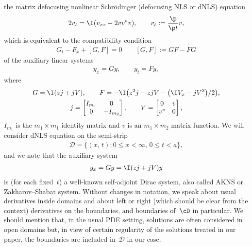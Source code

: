 the matrix defocusing nonlinear Schr\"odinger (defocusing NLS or dNLS) equation
\begin{gather} \label{1.1}
2v_t=\I(v_{xx}-2vv^*v), \qquad v_t:=\frac{\p}{\p t}v ,
\end{gather}
which is equivalent \cite{ZS1, ZS2} to the compatibility condition
\begin{gather} \label{zc}
G_t-F_x+[G,F]=0 \qquad [G,F]:=GF-FG
\end{gather}
of the auxiliary linear systems
\begin{gather} \label{au}
y_x=Gy, \qquad y_t=Fy,
\end{gather}
where
\begin{gather} \label{1.2}
G=\I (zj+jV), \qquad
F=-\I\big(z^2 j+ z jV-\big(\I V_x-jV^2\big)/2\big), \\
\label{1.3}
j = \left[
\begin{matrix}
I_{m_1} & 0 \\ 0 & -I_{m_2}
\end{matrix}
\right], \qquad V= \left[\begin{matrix}
0&v\\v^{*}&0\end{matrix}\right],
\end{gather}
$I_{m_1}$ is the $m_1\times m_1$ identity matrix and $v$ is an $m_1\times m_2$ matrix function.
We will consider dNLS equation on the semi-strip
\begin{gather}  \label{1.4}
{\mathcal D}=\{(x,\, t)\colon 0 \leq x <\infty, \, 0\leq t<a\},
\end{gather}
and we note that the auxiliary system
\begin{gather} \label{1.5}
y_x=Gy=\I(zj+jV)y
\end{gather}
is (for each f\/ixed~$t$) a well-known self-adjoint Dirac system, also called AKNS or Zakharov--Shabat system.
Without changes in notation, we speak about usual derivatives inside domains
and about left or right
(which should be clear from the context) derivatives
on the boundaries, and boundaries of~$\cD$ in particular.
We should mention that, in the usual PDE setting, solutions are often considered in open domains
but, in view of certain regularity of the solutions treated in our paper, the boundaries are included
in~${\mathcal D}$ in our case.
